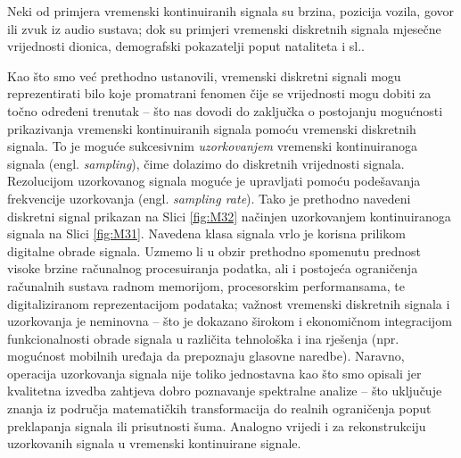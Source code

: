 \documentclass[a4paper,12pt,oneside]{memoir}
\begin{document}
            Neki od primjera vremenski kontinuiranih signala su brzina, pozicija vozila, govor ili zvuk iz audio sustava; dok su primjeri vremenski diskretnih signala mjesečne vrijednosti dionica, demografski pokazatelji poput nataliteta i sl..
            
            Kao što smo već prethodno ustanovili, vremenski diskretni signali mogu reprezentirati bilo koje promatrani fenomen čije se vrijednosti mogu dobiti za točno određeni trenutak -- što nas dovodi do zaključka o postojanju mogućnosti prikazivanja vremenski kontinuiranih signala pomoću vremenski diskretnih signala. To je moguće sukcesivnim \textit{uzorkovanjem} vremenski kontinuiranoga signala (engl. \textit{sampling}), čime dolazimo do diskretnih vrijednosti signala. Rezolucijom uzorkovanog signala moguće je upravljati pomoću podešavanja frekvencije uzorkovanja (engl. \textit{sampling rate}). Tako je prethodno navedeni diskretni signal prikazan na Slici \ref{fig:M32} načinjen uzorkovanjem kontinuiranoga signala na Slici \ref{fig:M31}.  Navedena klasa signala vrlo je korisna prilikom digitalne obrade signala. Uzmemo li u obzir prethodno spomenutu prednost visoke brzine računalnog procesuiranja podatka, ali i postojeća ograničenja računalnih sustava radnom memorijom, procesorskim performansama, te digitaliziranom reprezentacijom podataka; važnost vremenski diskretnih signala i uzorkovanja je neminovna -- što je dokazano širokom i ekonomičnom integracijom funkcionalnosti obrade signala u različita tehnološka i ina rješenja (npr. mogućnost mobilnih uređaja da prepoznaju glasovne naredbe). Naravno, operacija uzorkovanja signala nije toliko jednostavna kao što smo opisali jer kvalitetna izvedba zahtjeva dobro poznavanje spektralne analize -- što uključuje znanja iz područja matematičkih transformacija do realnih ograničenja poput preklapanja signala ili prisutnosti šuma. Analogno vrijedi i za rekonstrukciju uzorkovanih signala u vremenski kontinuirane signale.
\end{document}

